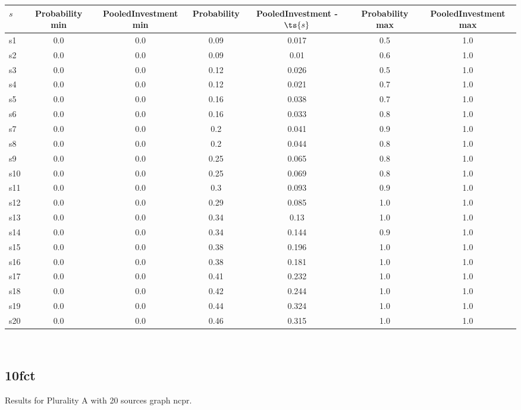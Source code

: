 \documentclass{article}
\begin{document}
\noindent\begin{tabular}{|l|c|c|c|c|c|c|}
\hline
$s$& Probability min & PooledInvestment min & Probability & PooledInvestment - $\ts{s}$ & Probability max & PooledInvestment max\\
\hline
s1 &0.0 & 0.0 & 0.09 & 0.017 & 0.5 & 1.0\\
\hline
s2 &0.0 & 0.0 & 0.09 & 0.01 & 0.6 & 1.0\\
\hline
s3 &0.0 & 0.0 & 0.12 & 0.026 & 0.5 & 1.0\\
\hline
s4 &0.0 & 0.0 & 0.12 & 0.021 & 0.7 & 1.0\\
\hline
s5 &0.0 & 0.0 & 0.16 & 0.038 & 0.7 & 1.0\\
\hline
s6 &0.0 & 0.0 & 0.16 & 0.033 & 0.8 & 1.0\\
\hline
s7 &0.0 & 0.0 & 0.2 & 0.041 & 0.9 & 1.0\\
\hline
s8 &0.0 & 0.0 & 0.2 & 0.044 & 0.8 & 1.0\\
\hline
s9 &0.0 & 0.0 & 0.25 & 0.065 & 0.8 & 1.0\\
\hline
s10 &0.0 & 0.0 & 0.25 & 0.069 & 0.8 & 1.0\\
\hline
s11 &0.0 & 0.0 & 0.3 & 0.093 & 0.9 & 1.0\\
\hline
s12 &0.0 & 0.0 & 0.29 & 0.085 & 1.0 & 1.0\\
\hline
s13 &0.0 & 0.0 & 0.34 & 0.13 & 1.0 & 1.0\\
\hline
s14 &0.0 & 0.0 & 0.34 & 0.144 & 0.9 & 1.0\\
\hline
s15 &0.0 & 0.0 & 0.38 & 0.196 & 1.0 & 1.0\\
\hline
s16 &0.0 & 0.0 & 0.38 & 0.181 & 1.0 & 1.0\\
\hline
s17 &0.0 & 0.0 & 0.41 & 0.232 & 1.0 & 1.0\\
\hline
s18 &0.0 & 0.0 & 0.42 & 0.244 & 1.0 & 1.0\\
\hline
s19 &0.0 & 0.0 & 0.44 & 0.324 & 1.0 & 1.0\\
\hline
s20 &0.0 & 0.0 & 0.46 & 0.315 & 1.0 & 1.0\\
\hline
\end{tabular}\\

\newpage

\subsection{10fct}

\noindent Results for Plurality A with 20 sources graph ncpr.
\end{document}
